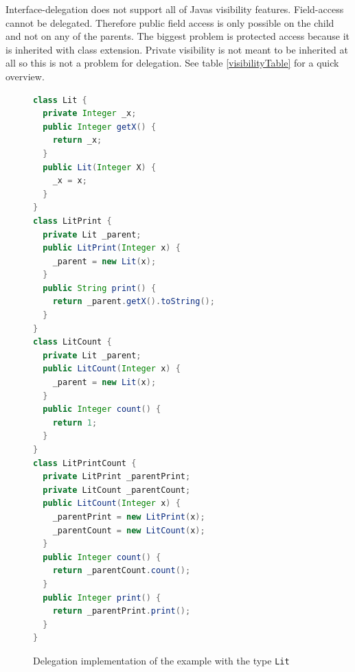 \documentclass{report}
\begin{document}
\begin{table}
\def\arraystretch{1.2}
\setlength\fboxsep{0.6pt}
\centering
{}
\caption{Visibility support for delegation}
\label{visibilityTable}
\end{table}
Interface-delegation does not support all of Javas visibility features. Field-access cannot be delegated. Therefore public field access is only possible on the child and not on any of the parents. The biggest problem is protected access because it is inherited with class extension. Private visibility is not meant to be inherited at all so this is not a problem for delegation. See table \ref{visibilityTable} for a quick overview.



\begin{figure}[H]
\begin{lstlisting}[language=java]
class Lit {
  private Integer _x;
  public Integer getX() {
    return _x;
  }
  public Lit(Integer X) {
    _x = x;
  }
}
class LitPrint {
  private Lit _parent;
  public LitPrint(Integer x) {
    _parent = new Lit(x);
  }
  public String print() {
    return _parent.getX().toString();
  }
}
class LitCount {
  private Lit _parent;
  public LitCount(Integer x) {
    _parent = new Lit(x);
  }
  public Integer count() {
    return 1;
  }
}
class LitPrintCount {
  private LitPrint _parentPrint;
  private LitCount _parentCount;
  public LitCount(Integer x) {
    _parentPrint = new LitPrint(x);
    _parentCount = new LitCount(x);
  }
  public Integer count() {
    return _parentCount.count();
  }
  public Integer print() {
    return _parentPrint.print();
  }
}
\end{lstlisting}
\caption{Delegation implementation of the example with the type \lstinline{Lit}}
\label{delegationExample}
\end{figure}
\end{document}

